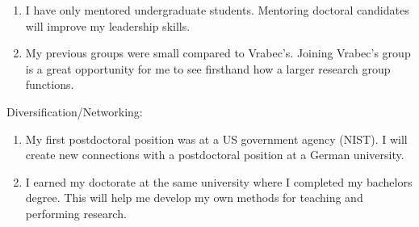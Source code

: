 \documentclass[12pt]{article}
\begin{document}
	\begin{enumerate}
		\item I have only mentored undergraduate students. Mentoring doctoral candidates will improve my leadership skills.
		\item My previous groups were small compared to Vrabec's. Joining Vrabec's group is a great opportunity for me to see firsthand how a larger research group functions.  
	\end{enumerate}
	
	Diversification/Networking:
	
	\begin{enumerate}
		\item My first postdoctoral position was at a US government agency (NIST). I will create new connections with a postdoctoral position at a German university.
		\item I earned my doctorate at the same university where I completed my bachelors degree. This will help me develop my own methods for teaching and performing research. 
	\end{enumerate}
	
\end{document}
